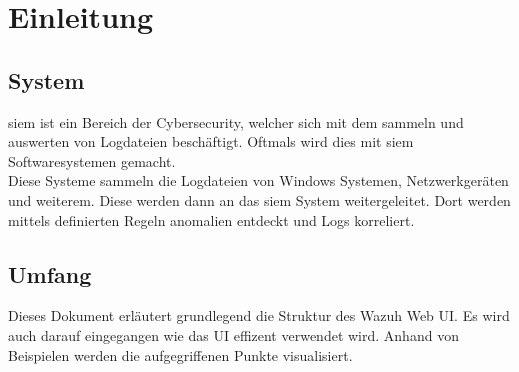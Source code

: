\chapter{Einleitung}

\section{ System}
\acrfull{siem} ist ein Bereich der Cybersecurity, welcher sich mit dem sammeln und auswerten von Logdateien beschäftigt.
Oftmals wird dies mit \acrshort{siem} Softwaresystemen gemacht.\\

Diese Systeme sammeln die Logdateien von Windows Systemen, Netzwerkgeräten und weiterem.
Diese werden dann an das \acrshort{siem} System weitergeleitet.
Dort werden mittels definierten Regeln anomalien entdeckt und Logs korreliert.

\section{Umfang}
Dieses Dokument erläutert grundlegend die Struktur des Wazuh Web UI.
Es wird auch darauf eingegangen wie das UI effizent verwendet wird.
Anhand von Beispielen werden die aufgegriffenen Punkte visualisiert.